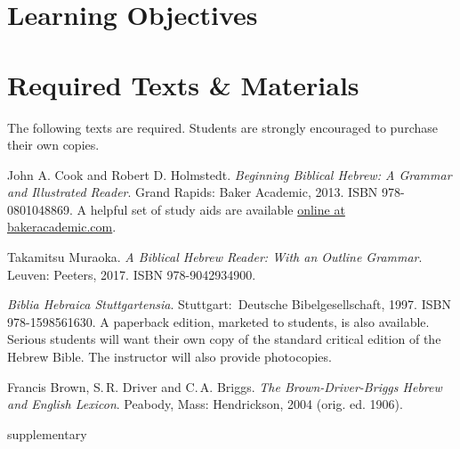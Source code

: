 \documentclass[titlepage]{article}
\newcommand\incl{../includes}
\begin{document}


  \section{Learning Objectives}
  \label{objectives}

  \edobject

\section{Required Texts \& Materials}
\label{texts}

The following texts are required. Students are strongly encouraged to
purchase their own copies.

\begingroup
\renewcommand{\section}[2]{}%
\begin{thebibliography}{BBH}%

    John A. Cook and Robert D. Holmstedt.
    \emph{Beginning Biblical Hebrew: A Grammar and Illustrated Reader}.
    Grand Rapids: Baker Academic, 2013. ISBN 978-0801048869. A helpful
    set of study aids are available \href{http://www.bakerpublishinggroup.com/books/beginning-biblical-hebrew/5629/students/esources}{online at bakeracademic.com}.

    Takamitsu Muraoka.
    \emph{A Biblical Hebrew Reader: With an Outline Grammar}.
    Leuven: Peeters, 2017. ISBN 978-9042934900.

    \emph{Biblia Hebraica Stuttgartensia}.
    Stuttgart: Deutsche Bibel\-ge\-sell\-schaft, 1997. ISBN 978-1598561630.
    A paperback edition, marketed to students, is also available.
    Serious students will want their own copy of the standard critical
    edition of the Hebrew Bible. The instructor will also provide
    photocopies.

    Francis Brown, S.\,R. Driver and C.\,A. Briggs. \emph{The
    Brown-Driver-Briggs Hebrew and English Lexicon}. Peabody, Mass:
    Hendrickson, 2004 (orig. ed. 1906).

\end{thebibliography}
\endgroup

\section{Supplementary Texts}
\label{supplementary}
\end{document}
